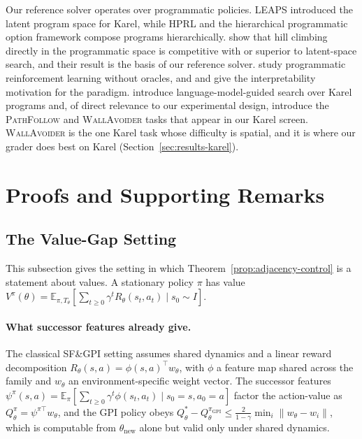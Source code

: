 \documentclass[twoside]{article}
\newcommand{\E}{\mathbb{E}}
\newcommand{\Tdist}{T}
\begin{document}
Our reference solver operates over programmatic policies. LEAPS \citep{trivedi2021learning} introduced the latent program space for Karel, while HPRL \citep{liu2023hierarchical} and the hierarchical programmatic option framework \citep{lin2024hierarchical} compose programs hierarchically. \citet{carvalho2024reclaiming} show that hill climbing directly in the programmatic space is competitive with or superior to latent-space search, and their result is the basis of our reference solver. \citet{qiu2022programmatic} study programmatic reinforcement learning without oracles, and \citet{verma2018programmatically} and \citet{bastani2018verifiable} give the interpretability motivation for the paradigm. \citet{liu2025llmgs} introduce language-model-guided search over Karel programs and, of direct relevance to our experimental design, introduce the \textsc{PathFollow} and \textsc{WallAvoider} tasks that appear in our Karel screen. \textsc{WallAvoider} is the one Karel task whose difficulty is spatial, and it is where our grader does best on Karel (Section~\ref{sec:results-karel}).


\section{Proofs and Supporting Remarks}
\label{app:proofs}

\subsection{The Value-Gap Setting}
\label{app:valuegap}

This subsection gives the setting in which Theorem~\ref{prop:adjacency-control} is a statement about values. A stationary policy $\pi$ has value $V^\pi(\theta) = \E_{\pi, \Tdist_\theta}[\sum_{t\ge0} \gamma^t R_\theta(s_t, a_t) \mid s_0 \sim I]$.

\paragraph{What successor features already give.} The classical SF\&GPI setting \citep{barreto2017successor, barreto2018transfer} assumes shared dynamics and a linear reward decomposition $R_\theta(s,a) = \phi(s,a)^\top w_\theta$, with $\phi$ a feature map shared across the family and $w_\theta$ an environment-specific weight vector. The successor features $\psi^\pi(s,a) = \E_\pi[\sum_{t\ge0} \gamma^t \phi(s_t,a_t) \mid s_0{=}s, a_0{=}a]$ factor the action-value as $Q^\pi_\theta = \psi^{\pi\top} w_\theta$, and the GPI policy obeys $Q^*_\theta - Q^{\pi_{\text{GPI}}}_\theta \le \tfrac{2}{1-\gamma}\min_i \|w_\theta - w_i\|$, which is computable from $\theta_{\text{new}}$ alone but valid only under shared dynamics.
\end{document}
